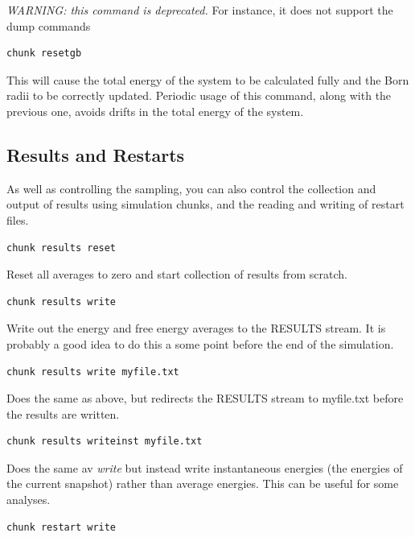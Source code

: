 \documentclass[letterpaper,10pt,english]{manual}
\begin{document}
\emph{WARNING: this command is deprecated.} For instance, it does not support the dump commands
\begin{Verbatim}[commandchars=@\[\]]
chunk resetgb
\end{Verbatim}

This will cause the total energy of the system to be calculated fully and the Born radii to be correctly updated. Periodic usage of this command, along with the previous one, avoids drifts in the total energy of the system.


\subsection{Results and Restarts}

As well as controlling the sampling, you can also control the collection and output of results using simulation chunks, and the reading and writing of restart files.
\begin{Verbatim}[commandchars=@\[\]]
chunk results reset
\end{Verbatim}

Reset all averages to zero and start collection of results from scratch.

\begin{Verbatim}[commandchars=@\[\]]
chunk results write
\end{Verbatim}

Write out the energy and free energy averages to the RESULTS stream. It is probably a good idea to do this a some point before the end of the simulation.

\begin{Verbatim}[commandchars=@\[\]]
chunk results write myfile.txt
\end{Verbatim}

Does the same as above, but redirects the RESULTS stream to myfile.txt before the results are written.

\begin{Verbatim}[commandchars=@\[\]]
chunk results writeinst myfile.txt
\end{Verbatim}

Does the same av \emph{write} but instead write instantaneous energies (the energies of the current snapshot) rather than average energies. This can be useful for some analyses.
\begin{Verbatim}[commandchars=@\[\]]
chunk restart write
\end{Verbatim}
\end{document}
